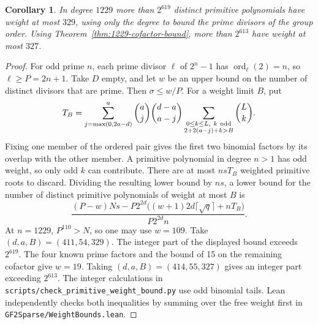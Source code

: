 \documentclass[11pt]{article}
\newtheorem{corollary}[theorem]{Corollary}
\newcommand{\ord}{\operatorname{ord}}
\begin{document}
\begin{corollary}\label{cor:primitive-weight-1229}
In degree \(1229\) more than \(2^{619}\) distinct primitive
polynomials have weight at most \(329\), using only the degree to
bound the prime divisors of the group order. Using
Theorem~\ref{thm:1229-cofactor-bound}, more than \(2^{613}\)
have weight at most \(327\).
\end{corollary}
\begin{proof}
For odd prime \(n\), each prime divisor \(\ell\) of \(2^n-1\) has
\(\ord_\ell(2)=n\), so \(\ell\ge P=2n+1\). Take \(D\) empty, and
let \(w\) be an upper bound on the number of distinct divisors that
are prime. Then \(\sigma\le w/P\). For a weight limit \(B\), put
\[
 T_B=\sum_{j=\max(0,2a-d)}^a\binom aj\binom{d-a}{a-j}
       \sum_{\substack{0\le k\le L,\ k\ {\rm odd}\\2+2(a-j)+k>B}}
                   \binom Lk .
\]
Fixing one member of the ordered pair gives the first two binomial
factors by its overlap with the other member. A primitive polynomial
in degree \(n>1\) has odd weight, so only odd \(k\) can contribute.
There are at most \(nsT_B\) weighted primitive roots to discard.
Dividing the resulting lower bound by \(ns\), a lower bound for the
number of distinct primitive polynomials of weight at most \(B\) is
\[
 \frac{(P-w)Ns-P2^{2d}\big((w+1)2d\lceil\sqrt q\rceil+nT_B\big)}
      {P2^{2d}n}.
\]
At \(n=1229\), \(P^{110}>N\), so one may use \(w=109\).
Take \((d,a,B)=(411,54,329)\). The integer part of the displayed
bound exceeds \(2^{619}\). The four known prime factors and the
bound of 15 on the remaining cofactor give \(w=19\).
Taking \((d,a,B)=(414,55,327)\) gives an integer part exceeding
\(2^{613}\). The integer calculations in
\nolinkurl{scripts/check_primitive_weight_bound.py} use odd binomial tails.
Lean independently checks both inequalities by summing over the free
weight first in \nolinkurl{GF2Sparse/WeightBounds.lean}.
\end{proof}
\end{document}
